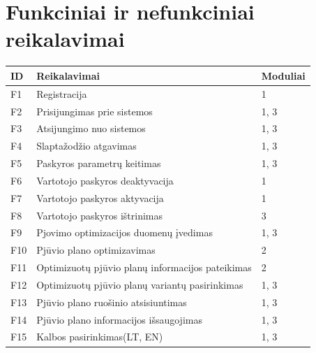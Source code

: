 \documentclass[a4paper,12pt]{article}
\begin{document}
\section{Funkciniai ir nefunkciniai reikalavimai}
\begin{frame}
\centering

\label{my-label}
\begin{tabular}{|l|l|l|}
\hline
\textbf{ID}	& \textbf{Reikalavimai}						& \textbf{Moduliai}  \\ \hline

F1	& Registracija										& 1	     		\\ \hline

F2	& Prisijungimas prie sistemos						& 1, 3			\\ \hline

F3	& Atsijungimo nuo sistemos							& 1, 3			\\ \hline

F4	& Slaptažodžio atgavimas								& 1, 3			\\ \hline

F5	& Paskyros parametrų keitimas 	  					& 1, 3			\\ \hline 

F6	& Vartotojo paskyros deaktyvacija					& 1				\\ \hline

F7	& Vartotojo paskyros aktyvacija						& 1				\\ \hline

F8	& Vartotojo paskyros ištrinimas						& 3				\\ \hline

F9	& Pjovimo optimizacijos duomenų įvedimas				& 1, 3			\\ \hline

F10	& Pjūvio plano optimizavimas           	   			& 2				\\ \hline

F11	& Optimizuotų pjūvio planų informacijos pateikimas	& 2     			\\ \hline

F12	& Optimizuotų pjūvio planų variantų pasirinkimas		& 1, 3			\\ \hline

F13 & Pjūvio plano ruošinio atsisiuntimas				& 1, 3			\\ \hline

F14 	& Pjūvio plano informacijos išsaugojimas				& 1, 3			\\ \hline

F15	& Kalbos pasirinkimas(LT, EN)						& 1, 3			\\ \hline


\end{tabular}
\end{frame}
\end{document}
